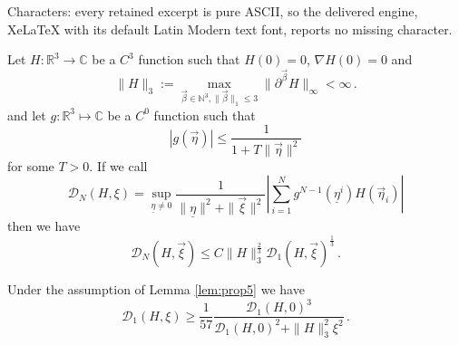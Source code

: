 \documentclass[10pt,a4paper]{amsart}
\newcommand \ul[1]{\underline{#1}}
\newcommand\calD{{\mathcal D}}
\renewcommand\v[1]{\vec{#1}}
\begin{document}
Characters: every retained excerpt is pure ASCII, so the delivered engine, XeLaTeX with its default Latin Modern text font, reports no missing character.
\begin{mylemma} \label{lem:prop5} 
Let $H: \mathds R^3\to\mathds C$ be a $C^3$ function such that $H(0)=0$, $\nabla H(0)=0$ and
\begin{equation}\label{eq:H3}
 \|H\|_3:=\max_{\v\beta\in\mathds N^3, \|\v\beta\|_1\leq 3}\bigl\|
\partial^{\v\beta}H\bigr\|_\infty<\infty\, .
\end{equation}
and let $g:\mathds R^3\mapsto \mathds C$ be a $C^0$ function such that
\[
|g(\v\eta)|\leq \frac1{1+T\|\v\eta\|^2}
\]
for some $T>0$. If we call
\[
\mathcal D_N(H,\xi)=\sup_{\ul \eta\not=0}\frac{1}{\|\ul \eta\|^2+\|\v\xi\|^2}
\left|\sum_{i=1}^N g^{ N - 1}(\ul \eta^i)H(\v\eta_i)\right|
\]
then we have 
\begin{equation}\label{eq:estima1}
\mathcal D_N(H,\v\xi)\leq C \|H\|_3^{\frac 23}\mathcal D_1(H,\v\xi)^{\frac13}\, .
\end{equation}
\end{mylemma}

\begin{myclaim}\label{claim:hr}
Under the assumption of Lemma \ref{lem:prop5} we have
\[
\calD_1(H,\xi)\geq \frac 1{57}\frac{\calD_1(H,0)^3}{\calD_1(H,0)^2+\|H\|_3^2\xi^2}\, .
\]
\end{myclaim}
\end{document}
